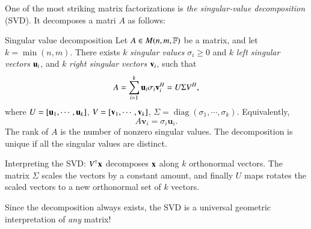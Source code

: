 One of the most striking matrix factorizations is \emph{the singular-value decomposition} (SVD). It decomposes a matri $A$ as follows:

\begin{myTheorem}{Singular value decomposition}{}
    Let $A \in M(n,m,\mathbb{F})$ be a matrix, and let $k = \min(n,m)$. There exists $k$ \emph{singular values} $\sigma_i \geq 0$ and $k$ \emph{left singular vectors} $\mathbf{u}_i$, and $k$ \emph{right singular vectors} $\mathbf{v}_i$, such that
    \begin{equation*}
        A = \sum_{i=1}^k \mathbf{u}_i \sigma_i \mathbf{v}_i^H = U \Sigma V^H,
    \end{equation*}
    where $U = [\mathbf{u}_1,\cdots,\mathbf{u}_k]$, $V = [\mathbf{v}_1,\cdots,\mathbf{v}_k]$, $\Sigma = \operatorname{diag}(\sigma_1,\cdots,\sigma_k)$. Equivalently,
    \begin{equation*}
        A \mathbf{v}_i = \sigma_i \mathbf{u}_i.
    \end{equation*}
    The rank of $A$ is the number of nonzero singular values. The decomposition is unique if all the singular values are distinct.
\end{myTheorem}

Interpreting the SVD: $V^\dag \mathbf{x}$ decomposes $\mathbf{x}$ along $k$ orthonormal vectors. The matrix $\Sigma$ scales the vectors by a constant amount, and finally $U$ maps rotates the scaled vectors to a new orthonormal set of $k$ vectors.

Since the decomposition always exists, the SVD is a universal geometric interpretation of \emph{any} matrix!

